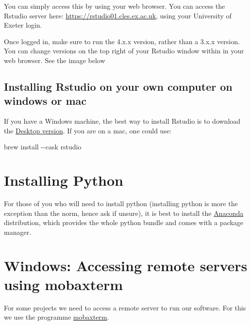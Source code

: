 \documentclass[
]{book}
\newenvironment{Shaded}{\begin{snugshade}}{\end{snugshade}}
\newcommand{\AttributeTok}[1]{\textcolor[rgb]{0.77,0.63,0.00}{#1}}
\newcommand{\ExtensionTok}[1]{#1}
\newcommand{\NormalTok}[1]{#1}
\begin{document}
You can simply access this by using your web browser. You can access the Rstudio server here:
\url{https://rstudio01.cles.ex.ac.uk}, using your University of Exeter login.

Once logged in, make sure to run the 4.x.x version, rather than a 3.x.x version. You can change versions on the top right of your Rstudio window within in your web browser. See the image below

\hypertarget{installing-rstudio-on-your-own-computer-on-windows-or-mac}{%
\subsection{Installing Rstudio on your own computer on windows or mac}\label{installing-rstudio-on-your-own-computer-on-windows-or-mac}}

If you have a Windows machine, the best way to install Rstudio is to download the \href{https://www.rstudio.com/products/rstudio/download/}{Desktop version}. If you are on a mac, one could use:

\begin{Shaded}
\begin{Highlighting}[]
\ExtensionTok{brew}\NormalTok{ install }\AttributeTok{{-}{-}cask}\NormalTok{ rstudio}
\end{Highlighting}
\end{Shaded}

\hypertarget{installing-python}{%
\section{Installing Python}\label{installing-python}}

For those of you who will need to install python (installing python is more the exception than the norm, hence ask if unsure), it is best to install the \href{https://www.anaconda.com/products/individual}{Anaconda} distribution, which provides the whole python bundle and comes with a package manager.

\hypertarget{section:mobaxterm}{%
\section{Windows: Accessing remote servers using mobaxterm}\label{section:mobaxterm}}

For some projects we need to access a remote server to run our software. For this we use the programme \href{https://mobaxterm.mobatek.net/download.html}{mobaxterm}.
\end{document}
